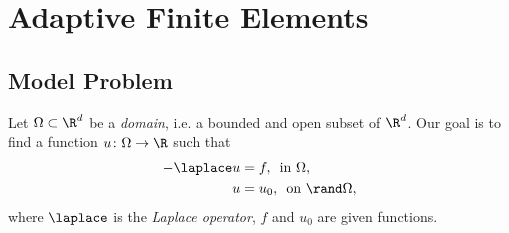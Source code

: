 
\chapter{Adaptive Finite Elements}
\section{Model Problem}
Let $\Omega\subset\R^d$ be a \textit{domain}, i.e. a bounded and open subset of $\R^d$. Our goal is to find a function $u\colon\Omega\to\R$ such that
\begin{align*}
    -\laplace u & = f,\,\text{ in } \Omega, \\
    u & =u_0,\,\text{ on } \boundary\Omega,
\end{align*}
where $\laplace$ is the \textit{Laplace operator}, $f$ and $u_0$ are given functions.
